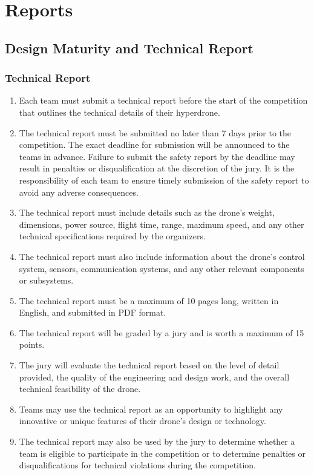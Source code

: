     \section{Reports}

    \subsection{Design Maturity and Technical Report}
    \subsubsection{Technical Report}
    \begin{enumerate}
    \item Each team must submit a technical report before the start of the competition that outlines the technical details of their hyperdrone.
    \item The technical report must be submitted no later than 7 days prior to the competition. The exact deadline for submission will be announced to the teams in advance. Failure to submit the safety report by the deadline may result in penalties or disqualification at the discretion of the jury. It is the responsibility of each team to ensure timely submission of the safety report to avoid any adverse consequences.
    \item The technical report must include details such as the drone's weight, dimensions, power source, flight time, range, maximum speed, and any other technical specifications required by the organizers.
    \item The technical report must also include information about the drone's control system, sensors, communication systems, and any other relevant components or subsystems.
    \item The technical report must be a maximum of 10 pages long, written in English, and submitted in PDF format.
    \item The technical report will be graded by a jury and is worth a maximum of 15 points.
    \item The jury will evaluate the technical report based on the level of detail provided, the quality of the engineering and design work, and the overall technical feasibility of the drone.
    \item Teams may use the technical report as an opportunity to highlight any innovative or unique features of their drone's design or technology.
    \item The technical report may also be used by the jury to determine whether a team is eligible to participate in the competition or to determine penalties or disqualifications for technical violations during the competition.
    \end{enumerate}
    
